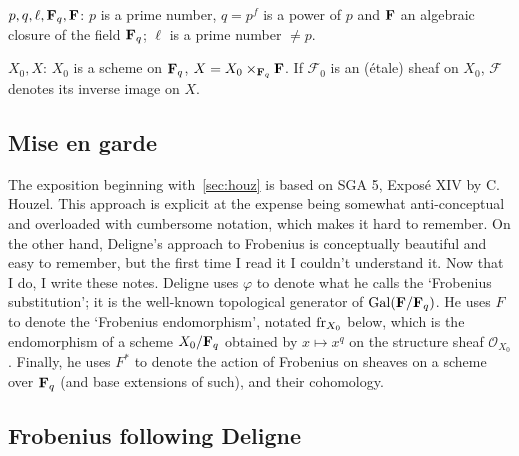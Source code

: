 \documentclass[deligne.tex]{subfiles}
\begin{document}
$p,q,\ell,\mathbf{F}_q,\mathbf{F}$: $p$ is a prime number, $q=p^f$ is a power of $p$ and 
$\mathbf{F}$ an algebraic closure of the field $\mathbf{F}_q$; $\ell$ is a prime number
$\ne p$.

$X_0,X$: $X_0$ is a scheme on $\mathbf{F}_q$, $X=X_0\times_{\mathbf{F}_q}\mathbf{F}$.
If $\mathscr F_0$ is an (étale) sheaf on $X_0$, $\mathscr F$ denotes its 
inverse image on $X$.

\subsection{Mise en garde}
The exposition beginning with~\ref{sec:houz} is based on SGA 5, Exposé XIV 
by C. Houzel. This approach is explicit at the expense being somewhat
anti-conceptual and overloaded with cumbersome notation, which makes it
hard to remember. On the other hand, Deligne's approach to Frobenius is
conceptually beautiful and easy to remember, but the first time I read it
I couldn't understand it. Now that I do, I write these notes.
Deligne uses $\varphi$ to denote what he calls the `Frobenius substitution';
it is the well-known topological generator of $\operatorname{Gal}(\mathbf{F}/\mathbf{F}_q)$.
He uses $F$ to denote the `Frobenius endomorphism', notated $\operatorname{fr}_{X_0}$
below, which is the endomorphism of a scheme $X_0/\mathbf{F}_q$ obtained by
$x\mapsto x^q$ on the structure sheaf $\mathscr O_{X_0}$.
Finally, he uses $F^*$ to denote the action of Frobenius on sheaves on a
scheme over $\mathbf{F}_q$ (and base extensions of such), and their cohomology.

\subsection{Frobenius following Deligne}
\end{document}
